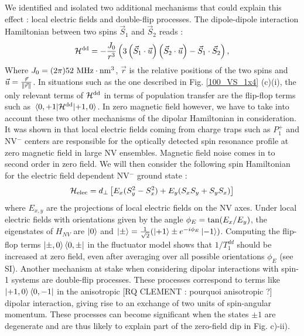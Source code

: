 \documentclass[preprintnumbers,amsmath,amssymb,superscriptaddress,twocolumn,showpacs]{revtex4-2}
\begin{document}
We identified and isolated two additional mechanisms that could explain this effect : local electric fields and double-flip processes. 
The dipole-dipole interaction Hamiltonian between two spins ${\vec S}_1$ and ${\vec S}_2$ reads :
\begin{equation}
\mathcal{H}^{\rm dd}= -\frac{J_0}{r^3}\left(3\left({\vec S}_1 \cdot \vec u \right)\left({\vec S}_2 \cdot \vec u \right) - {\vec S}_1 \cdot {\vec S}_2  \right),
\end{equation}
Where $J_0= (2 \pi) 52\ \rm MHz \cdot \rm{nm}^3$, $\vec r$ is the relative positions of the two spins and $\vec u = \frac{\vec r}{\norm{\vec r}}$. In situations such as the one described in Fig. \ref{100_VS_1x4} (c)(i), the only relevant terms of $\mathcal{H}^{\rm dd}$ in terms of population transfer are the flip-flop terms such as $\mel{0,+1}{\mathcal{H}^{\rm dd}}{+1,0}$. In zero magnetic field however, we have to take into account these two other mechanisms of the dipolar Hamiltonian in consideration.
It was shown in  \cite{mittiga2018imaging} that local electric fields coming from charge traps such as $P_1^+$ and NV$^-$ centers are responsible for the optically detected spin resonance profile at zero magnetic field in large NV ensembles. Magnetic field noise comes in to second order in zero field. %
We will then consider the following spin Hamiltonian for the electric field dependent NV$^-$ ground state : 
\begin{equation}
\label{NV Hamiltonian}
\mathcal{H}_{\rm elec}= d_\perp \left[ E_x(S_y^2-S_x^2) + E_y(S_xS_y+S_yS_x) \right]
\end{equation}
where $E_{x,y}$ are the projections of local electric fields on the NV axes. 
Under local electric fields with orientations given by the angle $\phi_E={\rm tan}(E_x/E_y)$, the eigenstates of $H_{NV}$ are $\ket{0}$ and $\ket{\pm}=\frac{1}{\sqrt{2}}(\ket{+1}\pm e^{-i\phi_E}\ket{-1})$.
Computing the flip-flop terms $\ket{\pm,0} \bra{0,\pm} $ in the fluctuator model shows that $1/T_1^{dd}$ should be increased at zero field, even after averaging over all possible orientations $\phi_E$ (see SI).  Another mechanism at stake when considering dipolar interactions with spin-1 systems are double-flip processes. 
These processes correspond to terms like $\ket{+1,0} \bra{0,-1}$ in the anisotropic [RQ CLEMENT : pourquoi anisotropic ?] dipolar interaction, giving rise to an exchange of two units of spin-angular momentum. These processes can become significant when the states $\pm 1$ are degenerate and are thus likely to explain part of the zero-field dip in Fig. c)-ii). 
\end{document}
